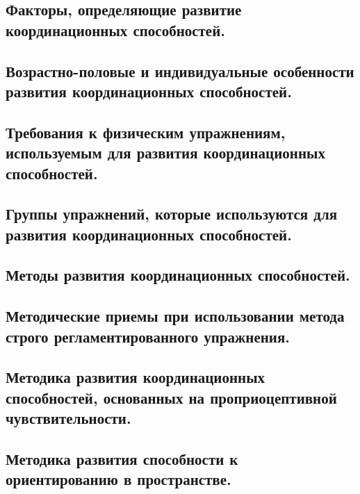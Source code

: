 \subsection{Факторы, определяющие развитие координационных способностей.}



\subsection{Возрастно-половые и индивидуальные особенности развития координационных способностей.}



\subsection{Требования к физическим упражнениям, используемым для развития координационных способностей.}



\subsection{Группы упражнений, которые используются для развития координационных способностей.}



\subsection{Методы развития координационных способностей.}



\subsection{Методические приемы при использовании метода строго регламентированного упражнения.}



\subsection{Методика развития координационных способностей, основанных на проприоцептивной чувствительности.}



\subsection{Методика развития способности к ориентированию в пространстве.}




